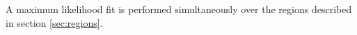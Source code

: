 A maximum likelihood fit is performed simultaneously over the regions described in section \ref{sec:regions}.